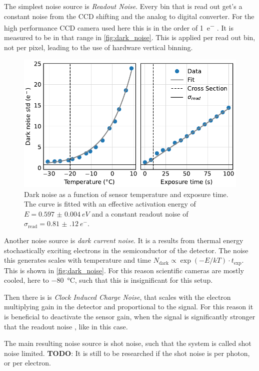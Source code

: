 \documentclass[
	parskip=half,
	a4paper,
]{scrarticle}
\begin{document}
The simplest noise source is \textit{Readout Noise}. Every bin that is read out get's a constant noise from the CCD shifting and the analog to digital converter. For the high performance CCD camera used here this is in the order of \SI{1}{e^-} \cite{andor_ixonem_nodate}. It is measured to be in that range in \autoref{fig:dark_noise}.
This is applied per read out bin, not per pixel, leading to the use of hardware vertical binning.

\begin{figure}[hb]
    \centering
    \includegraphics{../analysis/figures/dark_noise.pdf}
    \caption{Dark noise as a function of sensor temperature and exposure time. The curve is fitted with an effective activation energy of $E = \SI{0.597(4)}{eV}$ and a constant readout noise of $\sigma_{\text{read}} = \SI{0.81(12)}{e^-}$.}
    \label{fig:dark_noise}
\end{figure}
Another noise source is \textit{dark current noise}. 
It is a results from thermal energy stochastically exciting electrons in the semiconductor of the detector. The noise this generates scales with temperature and time $N_\text{dark} \propto \exp(-E / k T) \cdot t_\text{exp}$. This is shown in \autoref{fig:dark_noise}.
For this reason scientific cameras are mostly cooled, here to \SI{-80}{\degreeCelsius}, such that this is insignificant for this setup.


Then there is is \textit{Clock Induced Charge Noise}, that scales with the electron multiplying gain in the detector and proportional to the signal. For this reason it is beneficial to deactivate the sensor gain, when the signal is significantly stronger that the readout noise \cite{andor_establishing_nodate}, like in this case.

The main resulting noise source is shot noise, such that the system is called shot noise limited.
\textbf{TODO}: It is still to be researched if the shot noise is per photon, or per electron.
\end{document}
